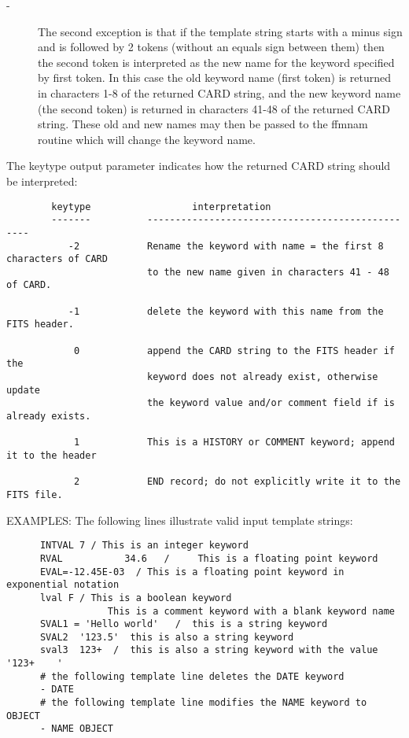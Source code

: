 \documentclass[11pt]{book}
\begin{document}
\begin{description}
\item[- ]     The second exception is that if the template string starts with
        a minus sign and is followed by 2 tokens (without an equals sign between
        them) then the second token
        is interpreted as the new name for the keyword specified by
        first token.  In this case the old keyword name (first token)
        is returned in characters 1-8 of the returned CARD string, and
        the new keyword name (the second token) is returned in characters
        41-48 of the returned CARD string.  These old and new names
        may then be passed to the ffmnam routine which will change
       the keyword name.
\end{description}

    The keytype output parameter indicates how the returned CARD string
    should be interpreted:

\begin{verbatim}
        keytype                  interpretation
        -------          -------------------------------------------------
           -2            Rename the keyword with name = the first 8 characters of CARD
                         to the new name given in characters 41 - 48 of CARD.

           -1            delete the keyword with this name from the FITS header.

            0            append the CARD string to the FITS header if the
                         keyword does not already exist, otherwise update
                         the keyword value and/or comment field if is already exists.

            1            This is a HISTORY or COMMENT keyword; append it to the header

            2            END record; do not explicitly write it to the FITS file.
\end{verbatim}
     EXAMPLES:  The following lines illustrate valid input template strings:

\begin{verbatim}
      INTVAL 7 / This is an integer keyword
      RVAL           34.6   /     This is a floating point keyword
      EVAL=-12.45E-03  / This is a floating point keyword in exponential notation
      lval F / This is a boolean keyword
                  This is a comment keyword with a blank keyword name
      SVAL1 = 'Hello world'   /  this is a string keyword
      SVAL2  '123.5'  this is also a string keyword
      sval3  123+  /  this is also a string keyword with the value '123+    '
      # the following template line deletes the DATE keyword
      - DATE
      # the following template line modifies the NAME keyword to OBJECT
      - NAME OBJECT
\end{verbatim}
\end{document}
